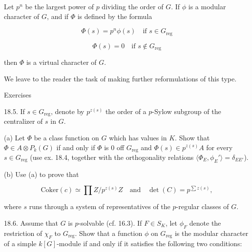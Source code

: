 Let $p^n$ be the largest power of $p$ dividing the order of $G$. If $\phi$ is a modular character of $G$, and if $\Phi$ is defined by the formula

$$\Phi(s) = p^n \phi(s) \quad \text{if } s \in G_{\text{reg}}$$

$$\Phi(s) = 0 \quad \text{if } s \notin G_{\text{reg}}$$

then $\Phi$ is a virtual character of $G$.

We leave to the reader the task of making further reformulations of this type.

Exercises

18.5. If $s \in G_{\text{reg}}$, denote by $p^{z(s)}$ the order of a $p$-Sylow subgroup of the centralizer of $s$ in $G$.

(a) Let $\Phi$ be a class function on $G$ which has values in $K$. Show that $\Phi \in A \otimes P_k(G)$ if and only if $\Phi$ is 0 off $G_{\text{reg}}$ and $\Phi(s) \in p^{z(s)}A$ for every $s \in G_{\text{reg}}$ (use ex. 18.4, together with the orthogonality relations $\langle \Phi_E, \phi_E' \rangle = \delta_{EE'}$).

(b) Use (a) to prove that

$$\text{Coker}(c) \simeq \prod Z/p^{z(s)}Z \quad \text{and} \quad \det(C) = p^{\sum z(s)},$$

where $s$ runs through a system of representatives of the $p$-regular classes of $G$.

18.6. Assume that $G$ is $p$-solvable (cf. 16.3). If $F \in S_K$, let $\phi_F$ denote the restriction of $\chi_F$ to $G_{\text{reg}}$. Show that a function $\phi$ on $G_{\text{reg}}$ is the modular character of a simple $k[G]$-module if and only if it satisfies the following two conditions:

